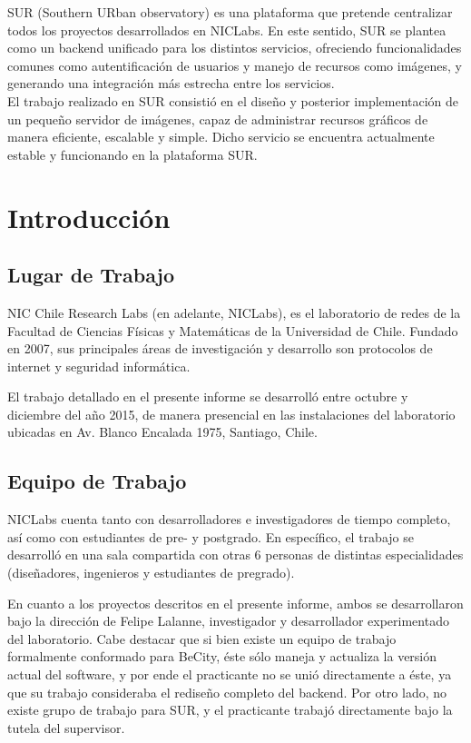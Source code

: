 \documentclass[11pt,letterpaper]{article}
\begin{document}
SUR (Southern URban observatory) es una plataforma que pretende centralizar todos los proyectos desarrollados en NICLabs. En este sentido, SUR se plantea como un backend unificado para los distintos servicios, ofreciendo funcionalidades comunes como autentificación de usuarios y manejo de recursos como imágenes, y generando una integración más estrecha entre los servicios.\\

El trabajo realizado en SUR consistió en el diseño y posterior implementación de un pequeño servidor de imágenes, capaz de administrar recursos gráficos de manera eficiente, escalable y simple. Dicho servicio se encuentra actualmente estable y funcionando en la plataforma SUR.
\newpage
\section{Introducción}
\subsection{Lugar de Trabajo}

NIC Chile Research Labs (en adelante, NICLabs)\cite{niclabs}, es el laboratorio de redes de la Facultad de Ciencias Físicas y Matemáticas de la Universidad de Chile. Fundado en 2007, sus principales áreas de investigación y desarrollo son protocolos de internet y seguridad informática.

El trabajo detallado en el presente informe se desarrolló entre octubre y diciembre del año 2015, de manera presencial en las instalaciones del laboratorio ubicadas en Av. Blanco Encalada 1975, Santiago, Chile.

\subsection{Equipo de Trabajo}


NICLabs cuenta tanto con desarrolladores e investigadores de tiempo completo, así como con estudiantes de pre- y postgrado. En específico, el trabajo se desarrolló en una sala compartida con otras 6 personas de distintas especialidades (diseñadores, ingenieros y estudiantes de pregrado).

En cuanto a los proyectos descritos en el presente informe, ambos se desarrollaron bajo la dirección de Felipe Lalanne\cite{lalanne}, investigador y desarrollador experimentado del laboratorio. Cabe destacar que si bien existe un equipo de trabajo formalmente conformado para BeCity, éste sólo maneja y actualiza la versión actual del software, y por ende el practicante no se unió directamente a éste, ya que su trabajo consideraba el rediseño completo del backend.
Por otro lado, no existe grupo de trabajo para SUR, y el practicante trabajó directamente bajo la tutela del supervisor.
\newpage
\end{document}

